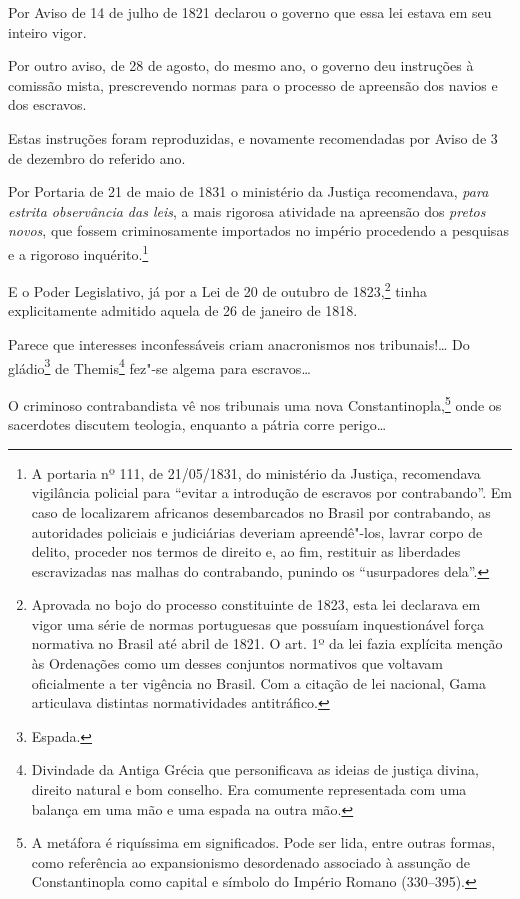 Por Aviso de 14 de julho de 1821 declarou o governo que essa lei estava
em seu inteiro vigor.

Por outro aviso, de 28 de agosto, do mesmo ano, o governo deu instruções
à comissão mista, prescrevendo normas para o processo de apreensão dos
navios e dos escravos.

Estas instruções foram reproduzidas, e novamente recomendadas por Aviso
de 3 de dezembro do referido ano.

Por Portaria de 21 de maio de 1831 o ministério da Justiça recomendava,
\emph{para estrita observância das leis}, a mais rigorosa atividade na
apreensão dos \emph{pretos novos}, que fossem criminosamente importados
no império procedendo a pesquisas e a rigoroso inquérito.\footnote{A
  portaria nº 111, de 21/05/1831, do ministério da Justiça, recomendava
  vigilância policial para ``evitar a introdução de escravos por
  contrabando''. Em caso de localizarem africanos desembarcados no Brasil
  por contrabando, as autoridades policiais e judiciárias deveriam
  apreendê"-los, lavrar corpo de delito, proceder nos termos de
  direito e, ao fim, restituir as liberdades escravizadas nas malhas
  do contrabando, punindo os ``usurpadores dela''.}

E o Poder Legislativo, já por a Lei de 20 de outubro de 1823,\footnote{
  Aprovada no bojo do processo constituinte de 1823, esta lei declarava
  em vigor uma série de normas portuguesas que possuíam inquestionável
  força normativa no Brasil até abril de 1821. O art. 1º da lei fazia
  explícita menção às Ordenações como um desses conjuntos normativos que
  voltavam oficialmente a ter vigência no Brasil. Com a citação de lei
  nacional, Gama articulava distintas normatividades
  antitráfico.} tinha
explicitamente admitido aquela de 26 de janeiro de 1818.

Parece que interesses inconfessáveis criam anacronismos nos
tribunais!\ldots{} Do gládio\footnote{Espada.} de Themis\footnote{
  Divindade da Antiga Grécia que personificava as ideias de justiça
  divina, direito natural e bom conselho. Era comumente representada com
  uma balança em uma mão e uma espada na outra mão.} fez"-se algema para
escravos\ldots{}

O criminoso contrabandista vê nos tribunais uma nova Constantinopla,\footnote{A metáfora é riquíssima em significados. Pode ser lida,
  entre outras formas, como referência ao expansionismo desordenado
  associado à assunção de Constantinopla como capital e símbolo do
  Império Romano (330--395).} onde os sacerdotes discutem teologia,
enquanto a pátria corre perigo\ldots{}

